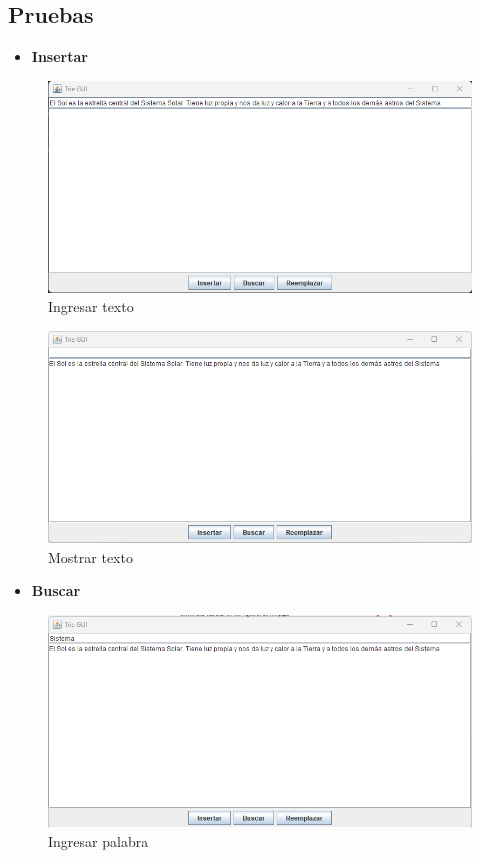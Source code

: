 \documentclass{article}
\begin{document}
\subsection{Pruebas}
 \begin{itemize}
        \item \textbf{Insertar}
 \end{itemize}
 \begin{figure}[H]
       \centering
       \includegraphics[scale=0.79]{img/img15.png}
       \caption{Ingresar texto}
       \label{fig:enter-label}
 \end{figure}
 \begin{figure}[H]
       \centering
       \includegraphics[scale=0.79]{img/img16.png}
       \caption{Mostrar texto}
       \label{fig:enter-label}
 \end{figure}
\clearpage
\begin{itemize}
    \item \textbf{Buscar}
\end{itemize}
\begin{figure}[H]
       \centering
       \includegraphics[scale=0.79]{img/img17.png}
       \caption{Ingresar palabra}
       \label{fig:enter-label}
 \end{figure}
\end{document}
